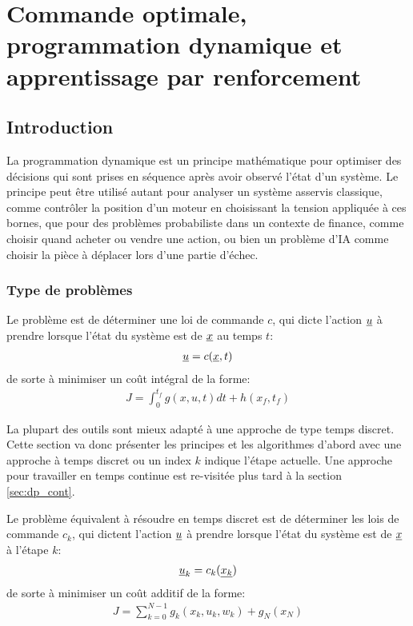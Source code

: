 \chapter{Commande optimale, programmation dynamique et apprentissage par renforcement}



\section{Introduction}

La programmation dynamique est un principe mathématique pour optimiser des décisions qui sont prises en séquence après avoir observé l'état d'un système. Le principe peut être utilisé autant pour analyser un système asservis classique, comme contrôler la position d'un moteur en choisissant la tension appliquée à ces bornes, que pour des problèmes probabiliste dans un contexte de finance, comme choisir quand acheter ou vendre une action, ou bien un problème d'IA comme choisir la pièce à déplacer lors d'une partie d'échec.

\subsection{Type de problèmes}

Le problème est de déterminer une loi de commande $c$, qui dicte l'action $\underline{u}$ à prendre lorsque l'état du système est de $\underline{x}$ au temps $t$:
\begin{align}
\underline{u} = c( \underline{x} , t )
\end{align}
de sorte à minimiser un coût intégral de la forme:
\begin{align}
    J=\int_0^{t_f}g(x,u,t) dt + h(x_f,t_f)
\end{align}

La plupart des outils sont mieux adapté à une approche de type temps discret. Cette section va donc présenter les principes et les algorithmes d'abord avec une approche à temps discret ou un index $k$ indique l'étape actuelle. Une approche pour travailler en temps continue est re-visitée plus tard à la section \ref{sec:dp_cont}. 

Le problème équivalent à résoudre en temps discret est de déterminer les lois de commande $c_k$, qui dictent l'action $\underline{u}$ à prendre lorsque l'état du système est de $\underline{x}$ à l'étape $k$:
\begin{align}
\underline{u}_k = c_k( \underline{x_k} )
\end{align}
de sorte à minimiser un coût additif de la forme:
\begin{align}
    J = \sum_{k=0}^{N-1} g_k(x_k, u_k , w_k) + g_N( x_N )
\end{align}

